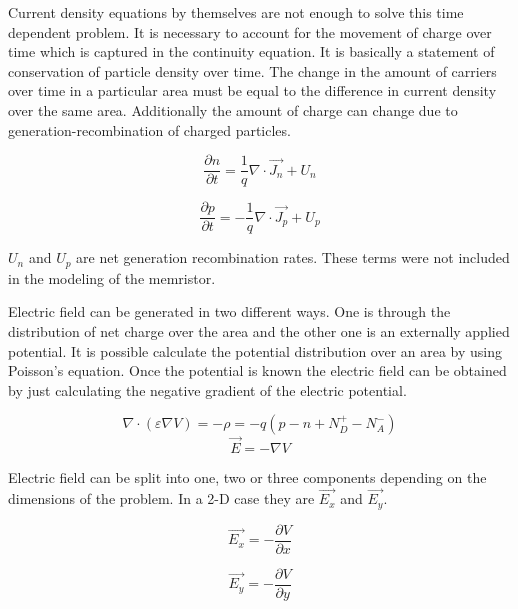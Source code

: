 \begin{doublespace}
Current density equations by themselves are not enough to solve this time dependent problem. It is necessary to account for the movement of charge over time which is captured in the continuity equation. It is basically a statement of conservation of particle density over time. The change in the amount of carriers over time in a particular area must be equal to the difference in current density over the same area. Additionally the amount of charge can change due to generation-recombination of charged particles.


\begin{equation}
\frac{\partial n}{\partial t}=\frac{1}{q}\nabla \cdot \vec{J_n}+U_{n}
\label{conn}
\end{equation}

\begin{equation}
\frac{\partial p}{\partial t}=-\frac{1}{q}\nabla \cdot \vec{J_p}+U_{p}
\label{conp}
\end{equation}

$U_{n}$ and $U_{p}$ are net generation recombination rates. These terms were not included in the modeling of the memristor. 

Electric field can be generated in two different ways. One is through the distribution of net charge over the area and the other one is an externally applied potential. It is possible calculate the potential distribution over an area by using Poisson's equation. Once the potential is known the electric field can be obtained by just calculating the negative gradient of the electric potential.

\begin{equation}
\nabla \cdot  (\varepsilon \nabla V)=-\rho=-q(p-n+N_{D}^{+}-N_{A}^{-})
\label{poisson}
\end{equation}
\begin{equation}
\vec{E}=-\nabla V
\label{Efield}
\end{equation}

Electric field can be split into one, two or three components depending on the dimensions of the problem. In a 2-D case they are $\vec{E_x}$ and $\vec{E_y}$.

\begin{equation}
\vec{E_x}=-\frac{\partial V}{\partial x}
\end{equation}

\begin{equation}
\vec{E_y}=-\frac{\partial V}{\partial y}
\end{equation}


\end{doublespace}
